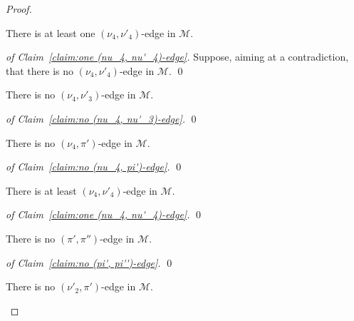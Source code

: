 \documentclass[a4paper,10pt]{llncs}
\begin{document}
\begin{proof}
  \begin{claim}
    \label{claim:one (nu_4, nu'_4)-edge}
    There is at least one $(\nu_4, \nu'_4)$-edge in $\mathcal{M}$.
  \end{claim}

  \begin{proof}[of Claim~\ref{claim:one (nu_4, nu'_4)-edge}]
    Suppose, aiming at a contradiction, that there is no
    $(\nu_4, \nu'_4)$-edge in $\mathcal{M}$.
    \qed
  \end{proof}

  \begin{claim}
    \label{claim:no (nu_4, nu'_3)-edge}
    There is no $(\nu_4, \nu'_3)$-edge in $\mathcal{M}$.
  \end{claim}

  \begin{proof}[of Claim~\ref{claim:no (nu_4, nu'_3)-edge}]
    \qed
  \end{proof}

  \begin{claim}
    \label{claim:no (nu_4, pi')-edge}
    There is no $(\nu_4, \pi')$-edge in $\mathcal{M}$.
  \end{claim}

  \begin{proof}[of Claim~\ref{claim:no (nu_4, pi')-edge}]
    \qed
  \end{proof}

  \begin{claim}
    \label{claim:one (nu_4, nu'_4)-edge}
    There is at least $(\nu_4, \nu'_4)$-edge in $\mathcal{M}$.
  \end{claim}

  \begin{proof}[of Claim~\ref{claim:one (nu_4, nu'_4)-edge}]
    \qed
  \end{proof}

  \begin{claim}
    \label{claim:no (pi', pi'')-edge}
    There is no $(\pi', \pi'')$-edge in $\mathcal{M}$.
  \end{claim}

  \begin{proof}[of Claim~\ref{claim:no (pi', pi'')-edge}]
    \qed
  \end{proof}

  \begin{claim}
    \label{claim:no (nu'_2, pi')-edge}
    There is no $(\nu'_2, \pi')$-edge in $\mathcal{M}$.
  \end{claim}


\end{proof}
\end{document}
